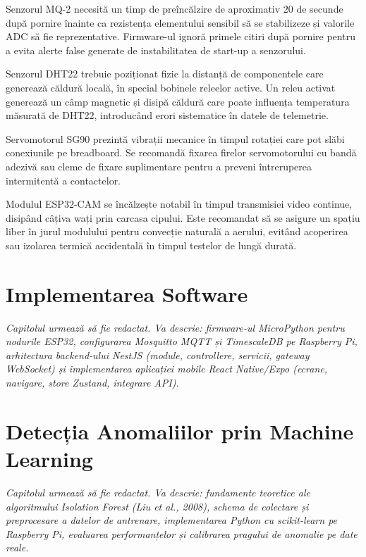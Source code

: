 \documentclass[12pt, twoside, a4paper]{report}
\begin{document}
Senzorul MQ-2 necesită un timp de preîncălzire de aproximativ 20 de secunde după pornire
înainte ca rezistența elementului sensibil să se stabilizeze și valorile ADC să fie
reprezentative. Firmware-ul ignoră primele citiri după pornire pentru a evita alerte false
generate de instabilitatea de start-up a senzorului.

Senzorul DHT22 trebuie poziționat fizic la distanță de componentele care generează căldură
locală, în special bobinele releelor active. Un releu activat generează un câmp magnetic
și disipă căldură care poate influența temperatura măsurată de DHT22, introducând erori
sistematice în datele de telemetrie.

Servomotorul SG90 prezintă vibrații mecanice în timpul rotației care pot slăbi conexiunile
pe breadboard. Se recomandă fixarea firelor servomotorului cu bandă adezivă sau cleme de
fixare suplimentare pentru a preveni întreruperea intermitentă a contactelor.

Modulul ESP32-CAM se încălzește notabil în timpul transmisiei video continue, disipând
câțiva wați prin carcasa cipului. Este recomandat să se asigure un spațiu liber în jurul
modulului pentru convecție naturală a aerului, evitând acoperirea sau izolarea termică
accidentală în timpul testelor de lungă durată.


\chapter{Implementarea Software}

\textit{Capitolul urmează să fie redactat. Va descrie: firmware-ul MicroPython pentru
nodurile ESP32, configurarea Mosquitto MQTT și TimescaleDB pe Raspberry Pi, arhitectura
backend-ului NestJS (module, controllere, servicii, gateway WebSocket) și implementarea
aplicației mobile React Native/Expo (ecrane, navigare, store Zustand, integrare API).}

\chapter{Detecția Anomaliilor prin Machine Learning}

\textit{Capitolul urmează să fie redactat. Va descrie: fundamente teoretice ale
algoritmului Isolation Forest (Liu et al., 2008), schema de colectare și preprocesare a
datelor de antrenare, implementarea Python cu scikit-learn pe Raspberry Pi, evaluarea
performanțelor și calibrarea pragului de anomalie pe date reale.}
\end{document}
